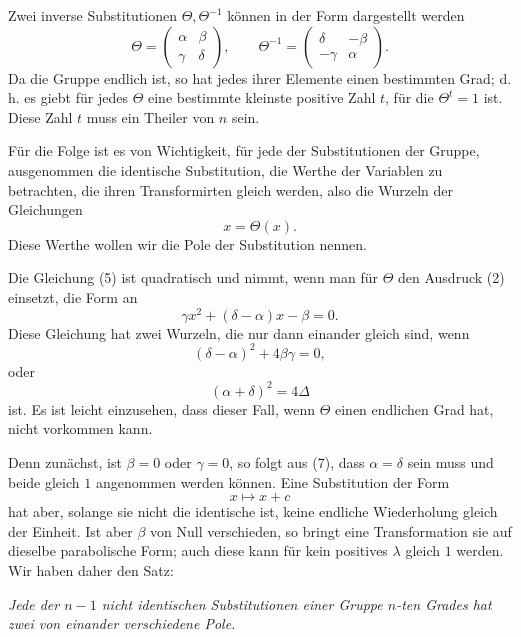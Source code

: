 \documentclass[11pt]{article}
\begin{document}
Zwei inverse Substitutionen $\Theta,\Theta^{-1}$ können in der Form dargestellt werden
\[
\Theta=\begin{pmatrix}\alpha&\beta\\\gamma&\delta\end{pmatrix},\qquad
\Theta^{-1}=\begin{pmatrix}\delta&-\beta\\-\gamma&\alpha\end{pmatrix}.
\]
Da die Gruppe endlich ist, so hat jedes ihrer Elemente einen bestimmten Grad; d. h. es giebt für jedes $\Theta$ eine bestimmte kleinste positive Zahl $t$, für die $\Theta^t=1$ ist. Diese Zahl $t$ muss ein Theiler von $n$ sein.

Für die Folge ist es von Wichtigkeit, für jede der Substitutionen der Gruppe, ausgenommen die identische Substitution, die Werthe der Variablen zu betrachten, die ihren Transformirten gleich werden, also die Wurzeln der Gleichungen
\begin{equation}
x=\Theta(x).
\tag{5}
\end{equation}
Diese Werthe wollen wir die Pole der Substitution nennen.

Die Gleichung (5) ist quadratisch und nimmt, wenn man für $\Theta$ den Ausdruck (2) einsetzt, die Form an
\begin{equation}
\gamma x^2+(\delta-\alpha)x-\beta=0.
\tag{6}
\end{equation}
Diese Gleichung hat zwei Wurzeln, die nur dann einander gleich sind, wenn
\begin{equation}
(\delta-\alpha)^2+4\beta\gamma=0,
\tag{7}
\end{equation}
oder
\begin{equation}
(\alpha+\delta)^2=4\Delta
\tag{8}
\end{equation}
ist. Es ist leicht einzusehen, dass dieser Fall, wenn $\Theta$ einen endlichen Grad hat, nicht vorkommen kann.

Denn zunächst, ist $\beta=0$ oder $\gamma=0$, so folgt aus (7), dass $\alpha=\delta$ sein muss und beide gleich $1$ angenommen werden können. Eine Substitution der Form
\[
x\mapsto x+c
\]
hat aber, solange sie nicht die identische ist, keine endliche Wiederholung gleich der Einheit. Ist aber $\beta$ von Null verschieden, so bringt eine Transformation sie auf dieselbe parabolische Form; auch diese kann für kein positives $\lambda$ gleich $1$ werden. Wir haben daher den Satz:

\emph{Jede der $n-1$ nicht identischen Substitutionen einer Gruppe $n$-ten Grades hat zwei von einander verschiedene Pole.}
\end{document}
